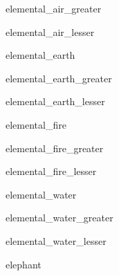 \documentclass[letterpaper,serif]{module}
\begin{document}
\begin{newmonster}{elemental_air_greater}\end{newmonster}

\begin{newmonster}{elemental_air_lesser}\end{newmonster}

\begin{newmonster}{elemental_earth}\end{newmonster}

\begin{newmonster}{elemental_earth_greater}\end{newmonster}

\begin{newmonster}{elemental_earth_lesser}\end{newmonster}

\begin{newmonster}{elemental_fire}\end{newmonster}

\begin{newmonster}{elemental_fire_greater}\end{newmonster}

\begin{newmonster}{elemental_fire_lesser}\end{newmonster}

\begin{newmonster}{elemental_water}\end{newmonster}

\begin{newmonster}{elemental_water_greater}\end{newmonster}

\begin{newmonster}{elemental_water_lesser}\end{newmonster}

\begin{newmonster}{elephant}\end{newmonster}
\end{document}

